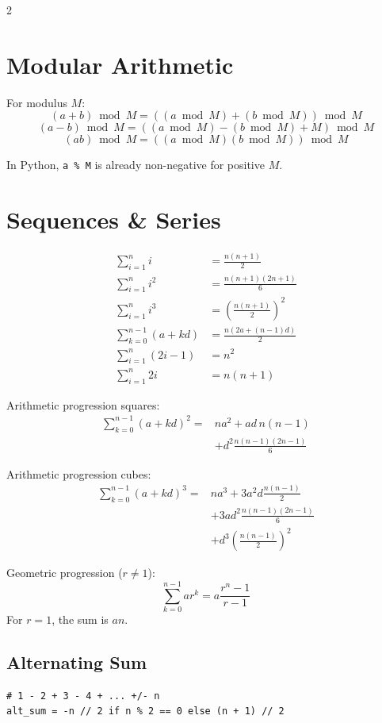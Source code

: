 \documentclass[9pt,a4paper]{extarticle}
\newcommand{\code}[1]{\texttt{#1}}
\begin{document}
\begin{multicols}{2}
\section{Modular Arithmetic}

For modulus $M$:
\[
(a+b)\bmod M=((a\bmod M)+(b\bmod M))\bmod M
\]
\[
(a-b)\bmod M=((a\bmod M)-(b\bmod M)+M)\bmod M
\]
\[
(ab)\bmod M=((a\bmod M)(b\bmod M))\bmod M
\]

In Python, \code{a \% M} is already non-negative for positive $M$.

\section{Sequences \& Series}

\begin{align*}
\sum_{i=1}^{n} i &= \frac{n(n+1)}2 \\
\sum_{i=1}^{n} i^2 &= \frac{n(n+1)(2n+1)}6 \\
\sum_{i=1}^{n} i^3 &= \left(\frac{n(n+1)}2\right)^2 \\
\sum_{k=0}^{n-1}(a+kd) &= \frac{n(2a+(n-1)d)}2 \\
\sum_{i=1}^{n}(2i-1) &= n^2 \\
\sum_{i=1}^{n}2i &= n(n+1)
\end{align*}

Arithmetic progression squares:
\begin{align*}
\sum_{k=0}^{n-1}(a+kd)^2
={}&na^2+a d\,n(n-1)\\
&+d^2\frac{n(n-1)(2n-1)}6
\end{align*}

Arithmetic progression cubes:
\begin{align*}
\sum_{k=0}^{n-1}(a+kd)^3
={}&na^3
+3a^2d\frac{n(n-1)}2\\
&+3ad^2\frac{n(n-1)(2n-1)}6\\
&+d^3\left(\frac{n(n-1)}2\right)^2
\end{align*}

Geometric progression ($r\ne1$):
\[
\sum_{k=0}^{n-1} ar^k=a\frac{r^n-1}{r-1}
\]
For $r=1$, the sum is $an$.

\subsection{Alternating Sum}
\begin{lstlisting}
# 1 - 2 + 3 - 4 + ... +/- n
alt_sum = -n // 2 if n % 2 == 0 else (n + 1) // 2


\end{lstlisting}
\end{multicols}
\end{document}
